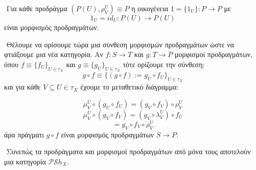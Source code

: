 $ $\newline
Για κάθε προδράγμα $(P(U),\rho^U_V) \equiv P$ η οικογένεια $1 = \{1_U\}: P \rightarrow P$ με
$$1_U = id_U: P(U) \rightarrow P(U)$$ είναι μορφισμός προδραγμάτων.

$ $\newline
Θέλουμε να ορίσουμε τώρα μια σύνθεση μορφισμών προδραγμάτων ώστε να φτιάξουμε μια νέα κατηγορία. Αν $f:S \rightarrow T$ και $g:T \rightarrow P$ μορφισμοί προδραγμάτων, όπου $f \equiv \{f_U\}_{U \in \tau_X}$ και $g \equiv \{g_U\}_{U \in \tau_X}$ τότε ορίζουμε την σύνθεση:
$$g \circ f \equiv \{ (g\circ f) := g_U \circ f_U \}_{U \in \tau_X}$$ και για κάθε $V\subseteq U \in \tau_X$ έχουμε το μεταθετικό διάγραμμα:

\begin{figure}[H]
    \centering
\end{figure}
$$\mu^U_V \circ (g_U \circ f_U) = (g_V \circ f_V)\circ \rho^U_V$$
$$\mu^U_V \circ (g_V \circ f_V) = (g_V \circ \lambda^U_V) \circ f_U$$
$$= g_V \circ f_V \circ \rho^U_V$$ άρα πράγματι $g\circ f$ είναι μορφισμός προδραγμάτων $S \rightarrow P$.

$ $\newline
Συνεπώς τα προδράγματα και μορφισμοί προδραγμάτων από μόνα τους αποτελούν μια κατηγορία $\mathcal{P}\mathcal{S}h_X$.